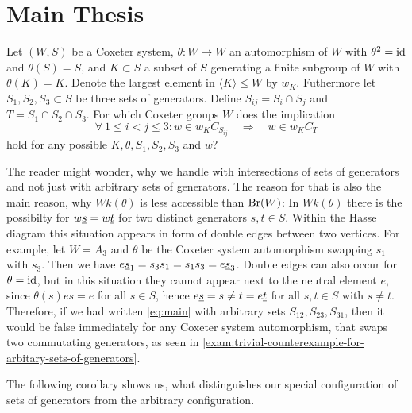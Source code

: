 \section{Main Thesis}
\label{sec:main-thesis}

\begin{ques}
	Let $(W,S)$ be a Coxeter system, $\theta : W \to W$ an automorphism of $W$ with $\theta^2 = \operatorname{id}$ and $\theta(S) = S$, and $K \subset S$ a subset of $S$ generating a finite subgroup of $W$ with $\theta(K) = K$. Denote the largest element in $\langle K \rangle \leq W$ by $w_K$. Futhermore let $S_1,S_2,S_3 \subset S$ be three sets of generators. Define $S_{ij} = S_i \cap S_j$ and $T = S_1 \cap S_2 \cap S_3$. For which Coxeter groups $W$ does the implication
	\begin{equation}
		\label{eq:main}
		\forall \ 1 \leq i < j \leq 3 : w \in w_K C_{S_{ij}} \quad \Rightarrow \quad w \in w_K C_T \tag*{($\ast$)}
	\end{equation}
	hold for any possible $K,\theta,S_1,S_2,S_3$ and $w$?
\end{ques}

The reader might wonder, why we handle with intersections of sets of generators and not just with arbitrary sets of generators. The reason for that is also the main reason, why $Wk(\theta)$ is less accessible than $\operatorname{Br}(W)$: In $Wk(\theta)$ there is the possibilty for $w \underline{s} = w \underline{t}$ for two distinct generators $s,t \in S$. Within the Hasse diagram this situation appears in form of double edges between two vertices. For example, let $W = A_3$ and $\theta$ be the Coxeter system automorphism swapping $s_1$ with $s_3$. Then we have $e \underline{s}_1 = s_3 s_1 = s_1 s_3 = e \underline{s}_3$. Double edges can also occur for $\theta = \operatorname{id}$, but in this situation they cannot appear next to the neutral element $e$, since $\theta(s)es = e$ for all $s \in S$, hence $e \underline{s} = s \neq t = e \underline{t}$ for all $s,t \in S$ with $s \neq t$. Therefore, if we had written \ref{eq:main} with arbitrary sets $S_{12},S_{23},S_{31}$, then it would be false immediately for any Coxeter system automorphism, that swaps two commutating generators, as seen in \ref{exam:trivial-counterexample-for-arbitary-sets-of-generators}.

The following corollary shows us, what distinguishes our special configuration of sets of generators from the arbitrary configuration.


